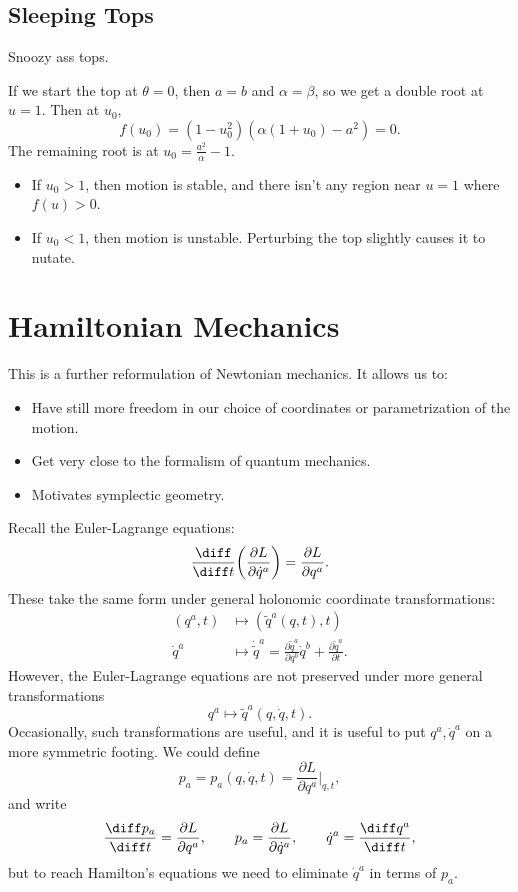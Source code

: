 \documentclass[12pt]{article}
\begin{document}
\subsection{Sleeping Tops}
\label{sub:sleeping_tops}

Snoozy ass tops.

If we start the top at $\theta = 0$, then $a = b$ and $\alpha = \beta$, so we get a double root at $u = 1$. Then at $u_0$,
\[
f(u_0) = (1 - u_0^2)(\alpha (1 + u_0) - a^2) = 0.
\]
The remaining root is at $u_0 = \frac{a^2}{\alpha} -1$.

\begin{itemize}
	\item If $u_0 > 1$, then motion is stable, and there isn't any region near $u = 1$ where $f(u) > 0$.
	\item If $u_0 < 1$, then motion is unstable. Perturbing the top slightly causes it to nutate.
\end{itemize}

\newpage

\section{Hamiltonian Mechanics}
\label{sec:hamilton}

This is a further reformulation of Newtonian mechanics. It allows us to:
\begin{itemize}
	\item Have still more freedom in our choice of coordinates or parametrization of the motion.
	\item Get very close to the formalism of quantum mechanics.
	\item Motivates symplectic geometry.
\end{itemize}

Recall the Euler-Lagrange equations:
\[
\frac{\diff}{\diff t} \biggl( \frac{\partial L}{\partial \dot q^a} \biggr) = \frac{\partial L}{\partial q^a}.
\]
These take the same form under general holonomic coordinate transformations:
\begin{align*}
	(q^a, t) &\mapsto (\tilde q^a(q, t), t) \\
	\dot q^a &\mapsto \dot{\tilde q}^a = \frac{\partial \tilde q^a}{\partial q^b} \dot q^b + \frac{\partial \tilde q^a}{\partial t}.
\end{align*}
However, the Euler-Lagrange equations are not preserved under more general transformations
\[
q^a \mapsto \tilde q^a(q, \dot q, t).
\]
Occasionally, such transformations are useful, and it is useful to put $q^a, \dot q^a$ on a more symmetric footing. We could define
\[
p_a = p_a(q, \dot q, t) = \frac{\partial L}{\partial q^a} \biggr|_{q, t},
\]
and write
\[
\frac{\diff p_a}{\diff t} = \frac{\partial L}{\partial q^a}, \qquad p_a = \frac{\partial L}{\partial \dot q^a}, \qquad \dot q^a = \frac{\diff q^a}{\diff t},
\]
but to reach Hamilton's equations we need to eliminate $\dot q^a$ in terms of $p_a$.
\end{document}
